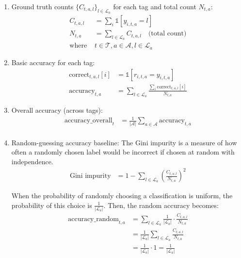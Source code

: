 \documentclass[../ShajiS_RnDReport.tex]{subfiles}
\begin{document}
\begin{enumerate}[label=\alph*)]
\item Ground truth counts \(\{C_{t,a,l}\}_{l \in \mathcal{L}_a}\) for each tag and total count \(N_{t,a}\):
\begin{align*}
    C_{t,a,l} &= \sum_{i} \mathbb{1}[y_{i,t,a} = l] \\
    N_{t,a} &= \sum_{l \in \mathcal{L}_a} C_{t,a,l} \quad \text{(total count)} \\
    \text{where } &t \in \mathcal{T}, a \in \mathcal{A}, l \in \mathcal{L}_a
\end{align*}

\item Basic accuracy for each tag:
\begin{align*}
    \text{correct}_{t,a,l}[i] &= \mathbb{1}[r_{i,t,a} = y_{i,t,a}] \\
    \text{accuracy}_{t,a} &= \sum_{l \in \mathcal{L}_a} \frac{\sum_i \text{correct}_{t,a,l}[i]}{N_{t,a}}
\end{align*}

\item Overall accuracy (across tags):
\begin{align*}
    \text{accuracy\_overall}_t &= \frac{1}{|\mathcal{A}|} \sum_{a \in \mathcal{A}} \text{accuracy}_{t,a} \\
\end{align*}

\item Random-guessing accuracy baseline:
The Gini impurity is a measure of how often a randomly chosen label would be incorrect if chosen at random with independence.
\begin{align*}
    \text{Gini impurity} &= 1 - \sum_{l \in \mathcal{L}_a} \left(\frac{C_{t,a,l}}{N_{t,a}}\right)^2
\end{align*}

When the probability of randomly choosing a classification is uniform, the probability of this choice is \(\frac{1}{|\mathcal{L}_a|}\). Then, the random accuracy becomes:
\begin{align*}
    \text{accuracy\_random}_{t,a} &= \sum_{l \in \mathcal{L}_a} \frac{1}{|\mathcal{L}_a|} \cdot \frac{C_{t,a,l}}{N_{t,a}} \\
    &= \frac{1}{|\mathcal{L}_a|} \sum_{l \in \mathcal{L}_a} \frac{C_{t,a,l}}{N_{t,a}} \\
    &= \frac{1}{|\mathcal{L}_a|} \cdot 1 = \frac{1}{|\mathcal{L}_a|}
\end{align*}
\end{enumerate}
\end{document}
